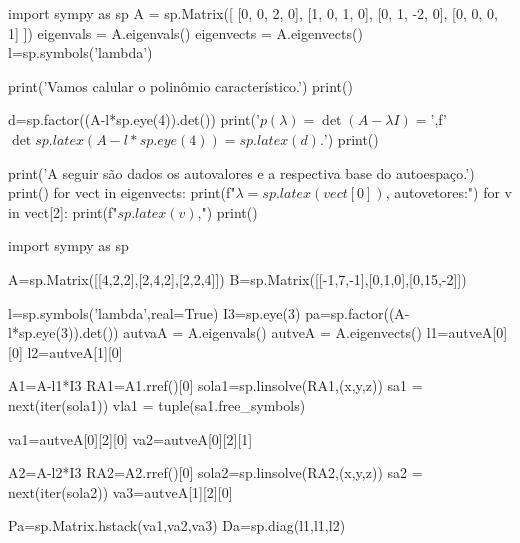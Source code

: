 \begin{solution} 
\begin{pycode}
import sympy as sp
A = sp.Matrix([
    [0, 0, 2, 0],
    [1, 0, 1, 0],
    [0, 1, -2, 0],
    [0, 0, 0, 1]
])
eigenvals = A.eigenvals()
eigenvects = A.eigenvects()
l=sp.symbols('lambda')

print('Vamos calular o polinômio característico.')
print()

d=sp.factor((A-l*sp.eye(4)).det())
print('\(p(\lambda)=\det(A-\lambda I)=\)',f'\(\det {sp.latex(A-l*sp.eye(4))}={sp.latex(d)}.\)')
print()

print('A seguir são dados os autovalores e a respectiva base do autoespaço.')
print()
for vect in eigenvects:
    print(f"$\lambda={sp.latex(vect[0])}$, autovetores:")
    for v in vect[2]:
        print(f"${sp.latex(v)}$,")
    print()

\end{pycode}


\end{solution}


\begin{pycode}
import sympy as sp

A=sp.Matrix([[4,2,2],[2,4,2],[2,2,4]])
B=sp.Matrix([[-1,7,-1],[0,1,0],[0,15,-2]])

l=sp.symbols('lambda',real=True)
I3=sp.eye(3)
pa=sp.factor((A-l*sp.eye(3)).det())
autvaA = A.eigenvals()
autveA = A.eigenvects()
l1=autveA[0][0]
l2=autveA[1][0]

A1=A-l1*I3
RA1=A1.rref()[0]
sola1=sp.linsolve(RA1,(x,y,z))
sa1 = next(iter(sola1))
vla1 = tuple(sa1.free_symbols)

va1=autveA[0][2][0]
va2=autveA[0][2][1]

A2=A-l2*I3
RA2=A2.rref()[0]
sola2=sp.linsolve(RA2,(x,y,z))
sa2 = next(iter(sola2))
va3=autveA[1][2][0]

Pa=sp.Matrix.hstack(va1,va2,va3)
Da=sp.diag(l1,l1,l2)

\end{pycode}

\question 
{}

